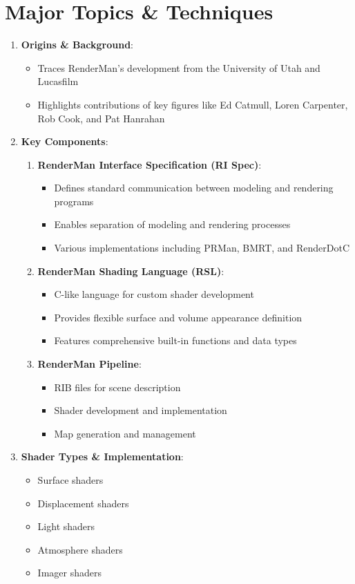 \documentclass[12pt]{article}
\begin{document}
\section{Major Topics \& Techniques}
\begin{enumerate}[noitemsep]
    \item \textbf{Origins \& Background}:
    \begin{itemize}[noitemsep]
        \item Traces RenderMan's development from the University of Utah and Lucasfilm
        \item Highlights contributions of key figures like Ed Catmull, Loren Carpenter, Rob Cook, and Pat Hanrahan
    \end{itemize}
    \item \textbf{Key Components}:
    \begin{enumerate}[label=\alph*), noitemsep]
        \item \textbf{RenderMan Interface Specification (RI Spec)}: 
        \begin{itemize}[noitemsep]
            \item Defines standard communication between modeling and rendering programs
            \item Enables separation of modeling and rendering processes
            \item Various implementations including PRMan, BMRT, and RenderDotC
        \end{itemize}
        \item \textbf{RenderMan Shading Language (RSL)}:
        \begin{itemize}[noitemsep]
            \item C-like language for custom shader development
            \item Provides flexible surface and volume appearance definition
            \item Features comprehensive built-in functions and data types
        \end{itemize}
        \item \textbf{RenderMan Pipeline}:
        \begin{itemize}[noitemsep]
            \item RIB files for scene description
            \item Shader development and implementation
            \item Map generation and management
        \end{itemize}
    \end{enumerate}
    \item \textbf{Shader Types \& Implementation}:
    \begin{itemize}[noitemsep]
        \item Surface shaders
        \item Displacement shaders
        \item Light shaders
        \item Atmosphere shaders
        \item Imager shaders
    \end{itemize}
\end{enumerate}
\end{document}
